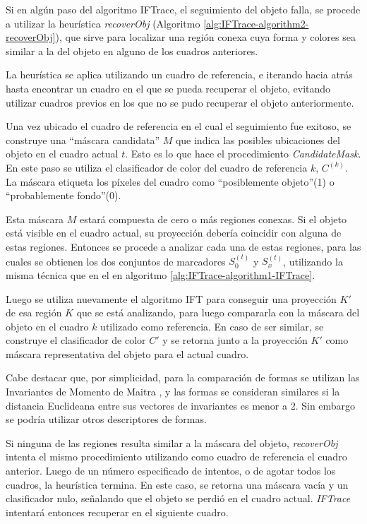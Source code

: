 \documentclass[a4paper,10pt]{article}
\begin{document}
Si en algún paso del algoritmo IFTrace, el seguimiento del objeto falla, se
procede a utilizar la heurística \textit{recoverObj} (Algoritmo
\ref{alg:IFTrace-algorithm2-recoverObj}), que sirve para localizar una región
conexa cuya forma y colores sea similar a la del objeto en alguno de los
cuadros anteriores.

La heurística se aplica utilizando un cuadro de referencia, e iterando hacia atrás
hasta encontrar un cuadro en el que se pueda recuperar el objeto, evitando
utilizar cuadros previos en los que no se pudo recuperar el objeto anteriormente.

Una vez ubicado el cuadro de referencia en el cual el seguimiento fue exitoso,
se construye una ``máscara candidata'' $M$ que indica las posibles ubicaciones
del objeto en el cuadro actual $t$. Esto es lo que hace el procedimiento \textit{CandidateMask}.
En este paso se
utiliza el clasificador de color del cuadro de referencia $k$, $C^{(k)}$. La máscara
etiqueta los píxeles del cuadro como ``posiblemente objeto''(1) o
``probablemente fondo''(0).

Esta máscara $M$ estará compuesta de cero
o más regiones conexas. Si el objeto está visible en el cuadro actual,
su proyección debería coincidir con alguna de estas regiones. Entonces
se procede a analizar cada una de estas regiones, para las cuales se obtienen
los dos conjuntos de marcadores $S_{0}^{(t)}$ y $S_{x}^{(t)}$, utilizando la misma técnica que en el
en algoritmo \ref{alg:IFTrace-algorithm1-IFTrace}.

 Luego se utiliza
nuevamente el algoritmo IFT para conseguir una proyección $K'$ de esa región $K$ que
se está analizando, para luego compararla con la máscara del objeto en el cuadro
$k$ utilizado como referencia. En caso de ser similar, se construye el clasificador
de color $C'$ y se retorna junto a la proyección $K'$ como máscara representativa
del objeto para el actual cuadro.

Cabe destacar que, por simplicidad, para la comparación de formas se utilizan
las Invariantes de Momento de Maitra \cite{MaitraMomentInvariants}, y las formas se consideran similares
si la distancia Euclideana entre sus vectores de invariantes es menor a 2.
Sin embargo se podría utilizar otros descriptores de formas.

Si ninguna de las regiones resulta similar a la máscara del objeto,
\textit{recoverObj} intenta el mismo procedimiento utilizando como cuadro de
referencia el cuadro anterior. Luego de un número especificado de intentos, o
de agotar todos los cuadros, la heurística termina. En este caso, se retorna
una máscara vacía y un clasificador nulo, señalando que el objeto se perdió en
el cuadro actual. \textit{IFTrace} intentará entonces recuperar en el siguiente
cuadro.
\end{document}
